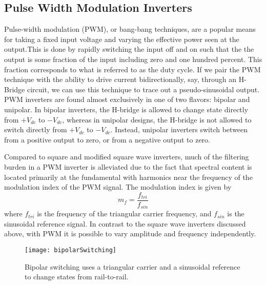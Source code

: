 \subsection{Pulse Width Modulation Inverters}
\label{pwmApproach}

Pulse-width modulation (PWM), or bang-bang techniques, are a popular means for taking a fixed input voltage and varying the effective power seen at the output.This is done by rapidly switching the input off and on such that the the output is some fraction of the input including zero and one hundred percent. This fraction corresponds to what is referred to as the duty cycle. If we pair the PWM technique with the ability to drive current bidirectionally, say, through an H-Bridge circuit, we can use this technique to trace out a pseudo-sinusoidal output. PWM inverters are found almost exclusively in one of two flavors: bipolar and unipolar. In bipolar inverters, the H-bridge is allowed to change state directly from $+V_{dc}$ to $-V_{dc}$, whereas in unipolar designs, the H-bridge is not allowed to switch directly from $+V_{dc}$ to $-V_{dc}$. Instead, unipolar inverters switch between from a positive output to zero, or from a negative output to zero.

Compared to square and modified square wave inverters, much of the filtering burden in a PWM inverter is alleviated due to the fact that spectral content is located primarily at the fundamental with harmonics near the frequency of the modulation index of the PWM signal. The modulation index is given by 
\begin{equation}
m_f=\frac{f_{tri}}{f_{sin}}
\end{equation}
where $f_{tri}$ is the frequency of the triangular carrier frequency, and $f_{sin}$ is the sinusoidal reference signal. In contrast to the square wave inverters discussed above, with PWM it is possible to vary amplitude and frequency independently. 

\begin{figure}[h]
\centering
\texttt{[image: bipolarSwitching]}
\caption{Bipolar switching uses a triangular carrier and a sinusoidal reference to change states from rail-to-rail. \cite{inverterFourier}}
\label{bipolar}
\end{figure}

